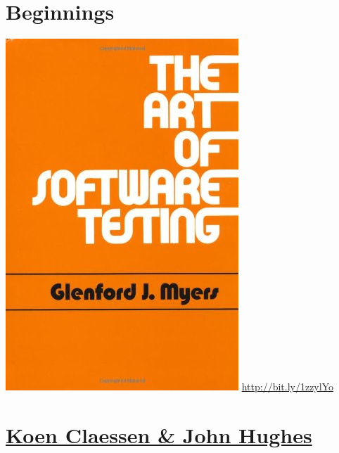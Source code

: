 \documentclass[11pt]{article}
\begin{document}
\section{Beginnings}
\label{sec-7}

\includegraphics[width=.9\linewidth]{../images/artof.jpg}
\url{http://bit.ly/1zzylYo}
\section{\href{http://www.cs.tufts.edu/~nr/cs257/archive/john-hughes/quick.pdf}{Koen Claessen \& John Hughes}}
\label{sec-8}
\end{document}
